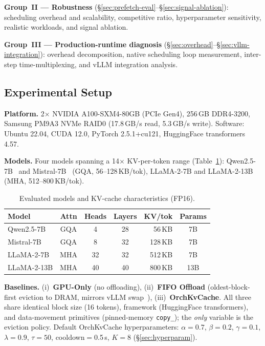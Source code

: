 \documentclass[conference]{IEEEtran}
\begin{document}
\noindent\textbf{Group~II --- Robustness} (\S\ref{sec:prefetch-eval}--\S\ref{sec:signal-ablation}): scheduling overhead and scalability, competitive ratio, hyperparameter sensitivity, realistic workloads, and signal ablation.

\noindent\textbf{Group~III --- Production-runtime diagnosis} (\S\ref{sec:overhead}--\S\ref{sec:vllm-integration}): overhead decomposition, native scheduling loop measurement, inter-step time-multiplexing, and vLLM integration analysis.

\subsection{Experimental Setup}

\textbf{Platform.} 2$\times$ NVIDIA A100-SXM4-80GB (PCIe Gen4), 256\,GB DDR4-3200, Samsung PM9A3 NVMe RAID0 (17.8\,GB/s read, 5.3\,GB/s write). Software: Ubuntu 22.04, CUDA 12.0, PyTorch 2.5.1+cu121, HuggingFace transformers 4.57.

\textbf{Models.} Four models spanning a 14$\times$ KV-per-token range (Table~\ref{tab:models}): Qwen2.5-7B~\cite{qwen2.5} and Mistral-7B~\cite{mistral} (GQA, 56--128\,KB/tok), LLaMA-2-7B and LLaMA-2-13B~\cite{llama2} (MHA, 512--800\,KB/tok).

\begin{table}[t]
\centering
\caption{Evaluated models and KV-cache characteristics (FP16).}
\label{tab:models}
\footnotesize
\setlength{\tabcolsep}{7pt}
\begin{tabular}{@{}lcccrc@{}}
\toprule
Model & Attn & Heads & Layers & KV/tok & Params \\
\midrule
Qwen2.5-7B   & GQA  & 4  & 28 & 56\,KB  & 7B  \\
Mistral-7B   & GQA  & 8  & 32 & 128\,KB & 7B  \\
LLaMA-2-7B   & MHA  & 32 & 32 & 512\,KB & 7B  \\
LLaMA-2-13B  & MHA  & 40 & 40 & 800\,KB & 13B \\
\bottomrule
\end{tabular}
\end{table}

\textbf{Baselines.} (i)~\textbf{GPU-Only} (no offloading), (ii)~\textbf{FIFO Offload} (oldest-block-first eviction to DRAM, mirrors vLLM swap~\cite{vllm}), (iii)~\textbf{OrchKvCache}. All three share identical block size (16 tokens), framework (HuggingFace transformers), and data-movement primitives (pinned-memory \texttt{copy\_}); the \emph{only} variable is the eviction policy. Default OrchKvCache hyperparameters: $\alpha{=}0.7$, $\beta{=}0.2$, $\gamma{=}0.1$, $\lambda{=}0.9$, $\tau{=}50$, cooldown$=$0.5\,s, $K{=}8$ (\S\ref{sec:hyperparam}).
\end{document}
